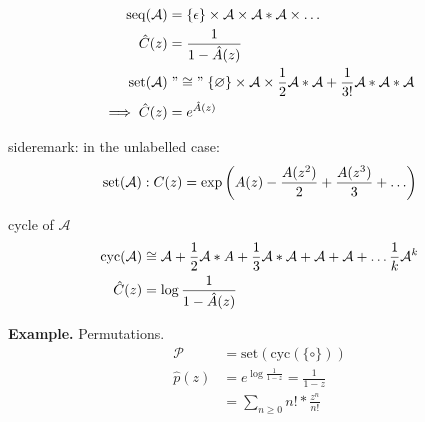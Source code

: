 \begin{align*}
    \operatorname{seq}(\mathcal{A}) &= \{\epsilon\} \times \mathcal{A} \times \mathcal{A}*\mathcal{A} \times \ldots \\
    \hat{C}(z) &= \frac{1}{1-\hat{A}(z)} \\
    \operatorname{set}(\mathcal{A}) &\mathrel{"\cong"} \{\varnothing\} 
        \times \mathcal{A} 
        \times \frac{1}{2}\mathcal{A} * \mathcal{A} + \frac{1}{3!}\mathcal{A}*\mathcal{A}*\mathcal{A} \\
        \implies \hat{C}(z) &= e^{\hat{A}(z)}
\end{align*}

sideremark: in the unlabelled case: 
\begin{align*}
  \operatorname{set}(\mathcal{A}): C(z) = \exp\left( A(z) - \frac{A(z^2)}{2} + \frac{A(z^3)}{3} + \ldots \right)
\end{align*}

cycle of $\mathcal{A}$
\begin{align*}
    \operatorname{cyc}(\mathcal{A}) &\cong \mathcal{A} + \frac{1}{2}\mathcal{A} * A + \frac{1}{3}\mathcal{A}*\mathcal{A} + \mathcal{A} + \mathcal{A} + \ldots \frac{1}{k}\mathcal{A}^k \\
    \hat{C}(z) &= \log\frac{1}{1-\hat{A}(z)}
\end{align*}

\textbf{Example.}
Permutations. 
\begin{align*}
    \mathcal{P} &= \text{set}(\text{cyc}(\{ \circ \} )) \\
    \hat{p}(z) &= e^{\log \frac{1}{1-z}} = \frac{1}{1-z} \\
        &= \sum_{n\geq 0} n! * \frac{z^n}{n!}
\end{align*}



